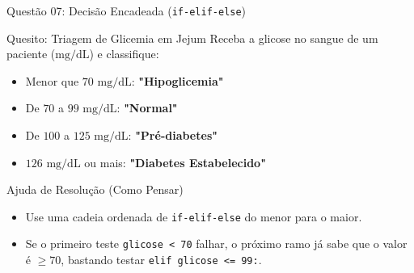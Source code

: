 \begin{frame}{Questão 07: Decisão Encadeada (\texttt{if-elif-else})}
    \begin{block}{Quesito: Triagem de Glicemia em Jejum}
        Receba a glicose no sangue de um paciente ($\text{mg/dL}$) e classifique:
        \begin{itemize}
            \item Menor que $70\text{ mg/dL}$: \textbf{"Hipoglicemia"}
            \item De $70$ a $99\text{ mg/dL}$: \textbf{"Normal"}
            \item De $100$ a $125\text{ mg/dL}$: \textbf{"Pré-diabetes"}
            \item $126\text{ mg/dL}$ ou mais: \textbf{"Diabetes Estabelecido"}
        \end{itemize}
    \end{block}

    \begin{exampleblock}{Ajuda de Resolução (Como Pensar)}
        \begin{itemize}
            \item Use uma cadeia ordenada de \texttt{if-elif-else} do menor para o maior.
            \item Se o primeiro teste \texttt{glicose < 70} falhar, o próximo ramo já sabe que o valor é $\ge 70$, bastando testar \texttt{elif glicose <= 99:}.
        \end{itemize}
    \end{exampleblock}
\end{frame}

